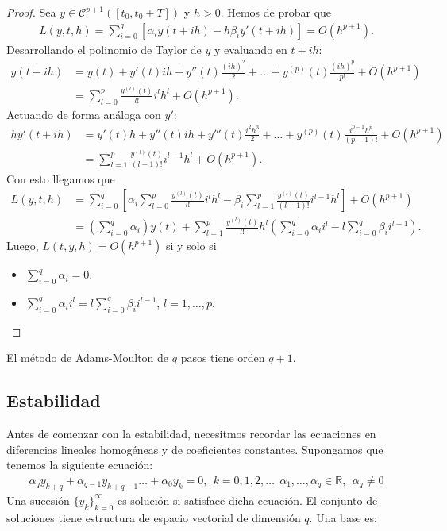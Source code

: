 \begin{proof}
Sea $y \in \mathscr{C}^{p+1}([t_0,t_0+T])$ y $h > 0$.  Hemos de probar que
\begin{align*}
    L(y,t,h) = \sum_{i=0}^{q}[\alpha_i y(t+ih) - h\beta_i y'(t+ih)] = O(h^{p+1}).
\end{align*}
Desarrollando el polinomio de Taylor de $y$ y evaluando en $t+ih$:
\begin{align*}
    y(t+ih) &= y(t) + y'(t)ih + y''(t)\frac{(ih)^2}{2} + \ldots + y^{(p)}(t)\frac{(ih)^p}{p!} + O(h^{p+1}) \\
    &= \sum_{l=0}^{p} \frac{y^{(l)}(t)}{l!}i^lh^l + O(h^{p+1}).
\end{align*}
Actuando de forma análoga con $y'$:
\begin{align*}
    hy'(t+ih) &= y'(t)h + y''(t)ih + y'''(t)\frac{i^2h^3}{2} + \ldots + y^{(p)}(t)\frac{i^{p-1}h^p}{(p-1)!} + O(h^{p+1}) \\
    &= \sum_{l=1}^{p} \frac{y^{(l)}(t)}{(l-1)!}i^{l-1}h^l + O(h^{p+1}).
\end{align*}
Con esto llegamos que
\begin{align*}
    L(y,t,h) &= \sum_{i=0}^{q} \left[ \alpha_i \sum_{l=0}^{p} \frac{y^{(l)}(t)}{l!}i^lh^l - \beta_i \sum_{l=1}^{p} \frac{y^{(l)}(t)}{(l-1)!}i^{l-1}h^l \right] + O(h^{p+1})\\
    &= \left( \sum_{i=0}^{q} \alpha_i \right) y(t) + \sum_{l=1}^{p} \frac{y^{(l)}(t)}{l!}h^l\left( \sum_{i=0}^{q} \alpha_i i^l - l\sum_{i=0}^{q} \beta_i i^{l-1} \right).
\end{align*}
Luego, $L(t,y,h) = O(h^{p+1})$ si y solo si
\begin{itemize}
    \item $\sum_{i=0}^{q} \alpha_i = 0$.
    \item $\sum_{i=0}^{q} \alpha_i i^l = l\sum_{i=0}^{q} \beta_i i^{l-1}$, $l = 1,\ldots,p$.
\end{itemize}
\end{proof}

\begin{prop}
El método de Adams-Moulton de $q$ pasos tiene orden $q+1$.
\end{prop}

\subsection{Estabilidad}
\noindent Antes de comenzar con la estabilidad, necesitmos recordar las ecuaciones en diferencias lineales homogéneas y de coeficientes constantes. Supongamos que tenemos la siguiente ecuación:
\begin{align*}
    \alpha_q y_{k+q} + \alpha_{q-1} y_{k+q-1} \ldots + \alpha_0 y_k = 0, \ \ k = 0,1,2,\ldots \ \ \alpha_1,\ldots,\alpha_q \in \mathbb{R}, \ \ \alpha_q \not = 0
\end{align*}
Una sucesión $\{y_k\}_{k=0}^{\infty}$ es solución si satisface dicha ecuación. El conjunto de soluciones tiene estructura de espacio vectorial de dimensión $q$. Una base es:

